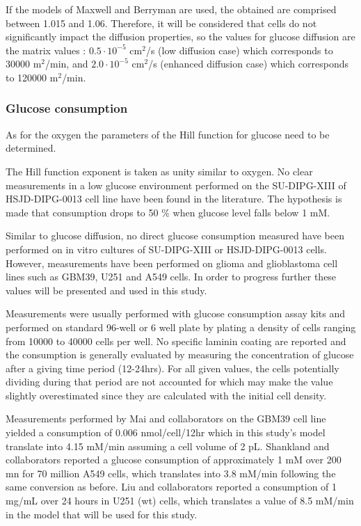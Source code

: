 \documentclass[11pt,a4paper]{article}
\begin{document}
If the models of Maxwell and Berryman are used, the obtained  are comprised between 1.015 and 1.06. Therefore, it will be considered that cells do not significantly impact the diffusion properties, so the values for glucose diffusion are the matrix values : $0.5\cdot 10^{-5}$ cm$^2$/s (low diffusion case) which corresponds to 30000 \textmu m$^2$/min, and $2.0\cdot 10^{-5}$ cm$^2$/s (enhanced diffusion case) which corresponds to 120000 \textmu m$^2$/min.

\subsubsection{Glucose consumption}
As for the oxygen the parameters of the Hill function for glucose need to be determined. 

The Hill function exponent is taken as unity similar to oxygen. No clear measurements in a low glucose environment performed on the SU-DIPG-XIII of HSJD-DIPG-0013 cell line have been found in the literature. The hypothesis is made that consumption drops to 50 \% when glucose level falls below 1 mM.

Similar to glucose diffusion, no direct glucose consumption measured have been performed on in vitro cultures of SU-DIPG-XIII or HSJD-DIPG-0013 cells. 
However, measurements have been performed on glioma and glioblastoma cell lines such as GBM39, U251 and A549 cells. In order to progress further these values will be presented and used in this study.

Measurements were usually performed with glucose consumption assay kits and performed on standard 96-well or 6 well plate by plating a density of cells ranging from 10000 to 40000 cells per well. No specific laminin coating are reported and the consumption is generally evaluated by measuring the concentration of glucose after a giving time period (12-24hrs). For all given values, the cells potentially dividing during that period are not accounted for which may make  the value slightly overestimated since they are calculated with the initial cell density.\cite{Mai2017}\cite{Shankland2002}\cite{LiuFM2021}

Measurements performed by Mai and collaborators on the GBM39 cell line yielded a consumption of 0.006 nmol/cell/12hr which in this study's model translate into 4.15 mM/min assuming a cell volume of 2 pL.\cite{Mai2017} Shankland and collaborators reported a glucose consumption of approximately 1 mM over 200 mn for 70 million A549 cells, which translates into 3.8 mM/min following the same conversion as before. Liu and collaborators reported a consumption of 1 mg/mL over 24 hours in U251 (wt) cells, which translates a value of 8.5 mM/min in the model that will be used for this study.\cite{Liu2021}
\end{document}
